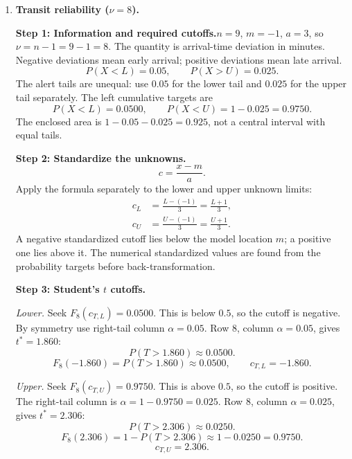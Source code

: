\begin{enumerate}[leftmargin=*,label=\textbf{\arabic*.},itemsep=12pt,parsep=3pt,topsep=5pt]
\par\noindent\begin{minipage}{\linewidth}
\par\textbf{Step 7: Interpretation.}\nopagebreak\enspace About $1\%$ of peak-demand deviations exceed $21.21$ MW above forecast under $t$, or $19.31$ MW above forecast under normal. The normal cutoff is about $1.90$ MW lower; each cutoff refers to its own model probability.
\end{minipage}\par
\item \begin{minipage}[t]{\linewidth}\textbf{Transit reliability ($\nu=8$).}\nopagebreak
\par\textbf{Step 1: Information and required cutoffs.}\nopagebreak\enspace $n=9$, $m=-1$, $a=3$, so $\nu=n-1=9-1=8$. The quantity is arrival-time deviation in minutes. Negative deviations mean early arrival; positive deviations mean late arrival.\[
P(X<L)=0.05,\qquad P(X>U)=0.025.
\]
The alert tails are unequal: use $0.05$ for the lower tail and $0.025$ for the upper tail separately. The left cumulative targets are\[
P(X<L)=0.0500,\qquad P(X<U)=1-0.025=0.9750.
\]
The enclosed area is $1-0.05-0.025=0.925$, not a central interval with equal tails.
\end{minipage}\par
\par\noindent\begin{minipage}{\linewidth}
\par\textbf{Step 2: Standardize the unknowns.}\nopagebreak\enspace \[
c=\frac{x-m}{a}.
\]
Apply the formula separately to the lower and upper unknown limits:
\[
\begin{aligned}c_L&=\frac{L-(-1)}{3}=\frac{L+1}{3},\\c_U&=\frac{U-(-1)}{3}=\frac{U+1}{3}.\end{aligned}
\]
A negative standardized cutoff lies below the model location $m$; a positive one lies above it. The numerical standardized values are found from the probability targets before back-transformation.
\end{minipage}\par
\par\noindent\begin{minipage}{\linewidth}
\par\textbf{Step 3: Student's $t$ cutoffs.}\nopagebreak\enspace \par\textit{Lower.} Seek $F_{8}(c_{T,L})=0.0500$. This is below $0.5$, so the cutoff is negative. By symmetry use right-tail column $\alpha=0.05$. Row $8$, column $\alpha=0.05$, gives $t^*=1.860$:\[
P(T>1.860)\approx0.0500.
\]
\[
F_{8}(-1.860)=P(T>1.860)\approx0.0500,\qquad c_{T,L}=-1.860.
\]
\par\textit{Upper.} Seek $F_{8}(c_{T,U})=0.9750$. This is above $0.5$, so the cutoff is positive. The right-tail column is $\alpha=1-0.9750=0.025$. Row $8$, column $\alpha=0.025$, gives $t^*=2.306$:\[
P(T>2.306)\approx0.0250.
\]
\[
F_{8}(2.306)=1-P(T>2.306)\approx1-0.0250=0.9750.
\]
\[
c_{T,U}=2.306.
\]


\end{minipage}
\end{enumerate}
